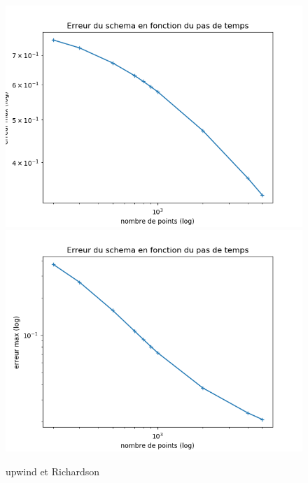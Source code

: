\documentclass[12pt]{article}
\begin{document}
\begin{figure}[H]
	\centering
	\includegraphics[scale=0.40]{erreur_schema1_init2.png}
	\includegraphics[scale=0.40]{erreur_schema2_init2.png}
	\caption{upwind et Richardson}
	\label{1D}
	\end{figure}	
\end{document}
